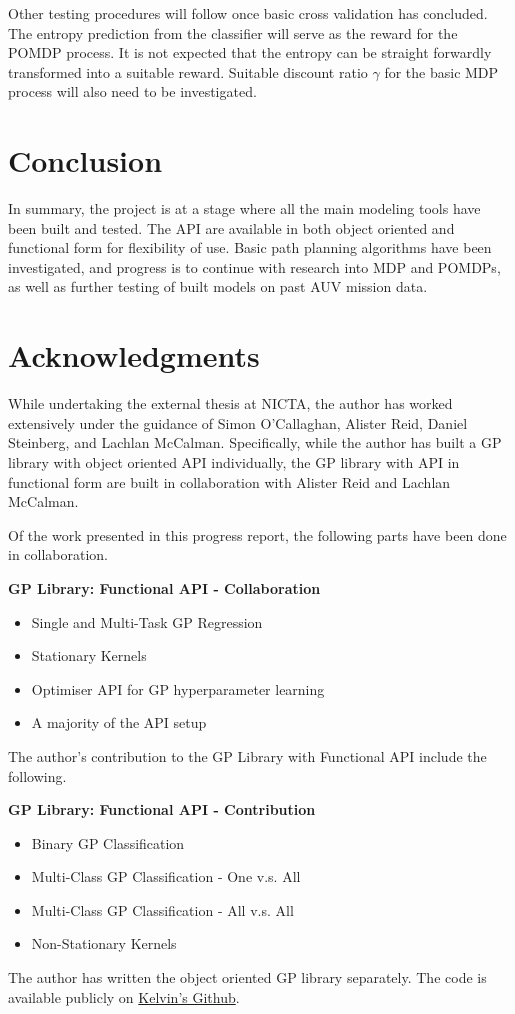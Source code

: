 		Other testing procedures will follow once basic cross validation has concluded. The entropy prediction from the classifier will serve as the reward for the POMDP process. It is not expected that the entropy can be straight forwardly transformed into a suitable reward. Suitable discount ratio $\gamma$ for the basic MDP process will also need to be investigated.
		
	\section{Conclusion}
	\label{ProgressReport:Conclusion}
	
		In summary, the project is at a stage where all the main modeling tools have been built and tested. The API are available in both object oriented and functional form for flexibility of use. Basic path planning algorithms have been investigated, and progress is to continue with research into MDP and POMDPs, as well as further testing of built models on past AUV mission data.
		
	\section{Acknowledgments}
	\label{ProgressReport:Acknowledgements}
		
		While undertaking the external thesis at NICTA, the author has worked extensively under the guidance of Simon O'Callaghan, Alister Reid, Daniel Steinberg, and Lachlan McCalman. Specifically, while the author has built a GP library with object oriented API individually, the GP library with API in functional form are built in collaboration with Alister Reid and Lachlan McCalman.
		
		Of the work presented in this progress report, the following parts have been done in collaboration.
		
		\textbf{GP Library: Functional API - Collaboration}
		\begin{itemize}
			\item Single and Multi-Task GP Regression
			\item Stationary Kernels
			\item Optimiser API for GP hyperparameter learning
			\item A majority of the API setup
		\end{itemize}
		
		The author's contribution to the GP Library with Functional API include the following.
		
		\textbf{GP Library: Functional API - Contribution}
		\begin{itemize}
			\item Binary GP Classification
			\item Multi-Class GP Classification - One v.s. All
			\item Multi-Class GP Classification - All v.s. All
			\item Non-Stationary Kernels
		\end{itemize}
		
		The author has written the object oriented GP library separately. The code is available publicly on \href{https://github.com/KelvyHsu/OceanTerrainExploration.git}{Kelvin's Github}. 